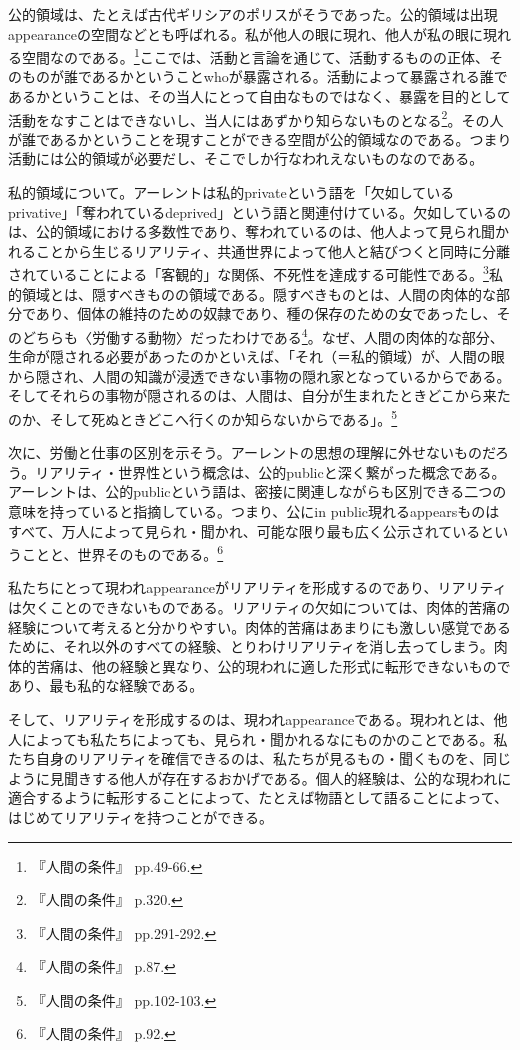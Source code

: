 \documentclass[b5j,twoside,twocolumn]{utarticle}
\begin{document}
公的領域は、たとえば古代ギリシアのポリスがそうであった。公的領域は出現appearanceの空間などとも呼ばれる。私が他人の眼に現れ、他人が私の眼に現れる空間なのである。\footnote{『人間の条件』 pp.49-66.}ここでは、活動と言論を通じて、活動するものの正体、そのものが誰であるかということwhoが暴露される。活動によって暴露される誰であるかということは、その当人にとって自由なものではなく、暴露を目的として活動をなすことはできないし、当人にはあずかり知らないものとなる\footnote{『人間の条件』 p.320.}。その人が誰であるかということを現すことができる空間が公的領域なのである。つまり活動には公的領域が必要だし、そこでしか行なわれえないものなのである。


私的領域について。アーレントは私的privateという語を「欠如しているprivative」「奪われているdeprived」という語と関連付けている。欠如しているのは、公的領域における多数性であり、奪われているのは、他人よって見られ聞かれることから生じるリアリティ、共通世界によって他人と結びつくと同時に分離されていることによる「客観的」な関係、不死性を達成する可能性である。\footnote{『人間の条件』 pp.291-292.}私的領域とは、隠すべきものの領域である。隠すべきものとは、人間の肉体的な部分であり、個体の維持のための奴隷であり、種の保存のための女であったし、そのどちらも〈労働する動物〉だったわけである\footnote{『人間の条件』 p.87.}。なぜ、人間の肉体的な部分、生命が隠される必要があったのかといえば、「それ（＝私的領域）が、人間の眼から隠され、人間の知識が浸透できない事物の隠れ家となっているからである。そしてそれらの事物が隠されるのは、人間は、自分が生まれたときどこから来たのか、そして死ぬときどこへ行くのか知らないからである」。\footnote{『人間の条件』 pp.102-103.}


次に、労働と仕事の区別を示そう。アーレントの思想の理解に外せないものだろう。リアリティ・世界性という概念は、公的publicと深く繋がった概念である。アーレントは、公的publicという語は、密接に関連しながらも区別できる二つの意味を持っていると指摘している。つまり、公にin public現れるappearsものはすべて、万人によって見られ・聞かれ、可能な限り最も広く公示されているということと、世界そのものである。\footnote{『人間の条件』 p.92.}


私たちにとって現われappearanceがリアリティを形成するのであり、リアリティは欠くことのできないものである。リアリティの欠如については、肉体的苦痛の経験について考えると分かりやすい。肉体的苦痛はあまりにも激しい感覚であるために、それ以外のすべての経験、とりわけリアリティを消し去ってしまう。肉体的苦痛は、他の経験と異なり、公的現われに適した形式に転形できないものであり、最も私的な経験である。


そして、リアリティを形成するのは、現われappearanceである。現われとは、他人によっても私たちによっても、見られ・聞かれるなにものかのことである。私たち自身のリアリティを確信できるのは、私たちが見るもの・聞くものを、同じように見聞きする他人が存在するおかげである。個人的経験は、公的な現われに適合するように転形することによって、たとえば物語として語ることによって、はじめてリアリティを持つことができる。
\end{document}
